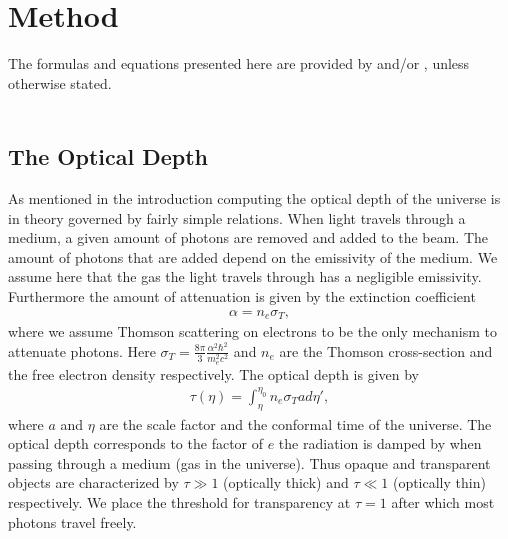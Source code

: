 \documentclass[twocolumn]{aastex62}
\begin{document}
\section{Method} \label{sec:Method}
The formulas and equations presented here are provided by \cite{winther:2020} and/or \cite{dodelson:2003}, unless otherwise stated.\\\\
\subsection{The Optical Depth}
As mentioned in the introduction computing the optical depth of the universe is in theory governed by fairly simple relations. When light travels through a medium, a given amount of photons are removed and added to the beam. The amount of photons that are added depend on the emissivity of the medium. We assume here that the gas the light travels through has a negligible emissivity. Furthermore the amount of attenuation is given by the extinction coefficient
\begin{align}
    \alpha = n_e\sigma_T,
\end{align}
where we assume Thomson scattering on electrons to be the only mechanism to attenuate photons. Here $\sigma_T = \frac{8\pi}{3}\frac{\alpha^2\hbar^2}{m_e^2c^2}$
and $n_e$ are the Thomson cross-section and the free electron density respectively. The optical depth is given by 
\begin{align}
    \tau(\eta) = \int_{\eta}^{\eta_0} n_e \sigma_T a d\eta',
\end{align}
where $a$ and $\eta$ are the scale factor and the conformal time of the universe.
The optical depth corresponds to the factor of $e$ the radiation is damped by when passing through a medium (gas in the universe). Thus opaque and transparent objects are characterized by $\tau \gg 1$ (optically thick) and $\tau \ll 1$ (optically thin) respectively. We place the threshold for transparency at $\tau = 1$ after which most photons travel freely.
\end{document}
